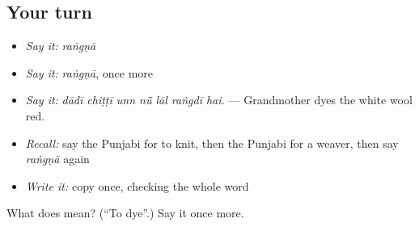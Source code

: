 \subsection*{Your turn}
\begin{itemize}
\raggedright
  \item \emph{Say it:} \emph{raṅgṇā}
  \item \emph{Say it:} \emph{raṅgṇā}, once more
  \item \emph{Say it:} \emph{dādī chiṭṭī unn nū̃ lāl raṅgdī hai.} — Grandmother dyes the white wool red.
  \item \emph{Recall:} say the Punjabi for to knit, then the Punjabi for a weaver, then say \emph{raṅgṇā} again
  \item \emph{Write it:} copy \textbf{} once, checking the whole word
\end{itemize}

\begin{tcolorbox}[breakable,colback=teal!4,colframe=teal!35!black,title={Before you move on}]
What does  mean? (\textquotedblleft{}To dye\textquotedblright{}.) Say it once more.
\end{tcolorbox}
